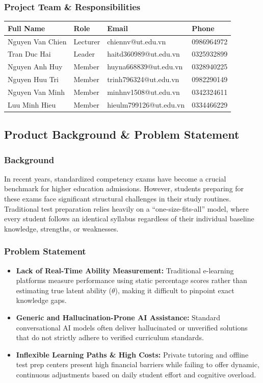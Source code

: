 \documentclass[12pt,a4paper]{article}
\begin{document}
\subsubsection{Project Team \& Responsibilities}
\begin{table}[H]
\centering
\small
\renewcommand{\arraystretch}{1.3}
\begin{tabularx}{\textwidth}{l l X l}
\toprule
\textbf{Full Name} & \textbf{Role} & \textbf{Email} & \textbf{Phone} \\
\midrule
Nguyen Van Chien & Lecturer & chiennv@ut.edu.vn & 0986964972 \\
Tran Duc Hai & Leader & haitd360989@ut.edu.vn & 0325932899 \\
Nguyen Anh Huy & Member & huyna668839@ut.edu.vn & 0328940225 \\
Nguyen Huu Tri & Member & trinh796324@ut.edu.vn & 0982290149 \\
Nguyen Van Minh & Member & minhnv1508@ut.edu.vn & 0342324611 \\
Luu Minh Hieu & Member & hieulm799126@ut.edu.vn & 0334466229 \\
\bottomrule
\end{tabularx}
\end{table}

\subsection{Product Background \& Problem Statement}
\subsubsection{Background}
In recent years, standardized competency exams have become a crucial benchmark for higher education admissions. However, students preparing for these exams face significant structural challenges in their study routines. Traditional test preparation relies heavily on a ``one-size-fits-all'' model, where every student follows an identical syllabus regardless of their individual baseline knowledge, strengths, or weaknesses.

\subsubsection{Problem Statement}
\begin{itemize}
    \item \textbf{Lack of Real-Time Ability Measurement:} Traditional e-learning platforms measure performance using static percentage scores rather than estimating true latent ability ($\theta$), making it difficult to pinpoint exact knowledge gaps.
    \item \textbf{Generic and Hallucination-Prone AI Assistance:} Standard conversational AI models often deliver hallucinated or unverified solutions that do not strictly adhere to verified curriculum standards.
    \item \textbf{Inflexible Learning Paths \& High Costs:} Private tutoring and offline test prep centers present high financial barriers while failing to offer dynamic, continuous adjustments based on daily student effort and cognitive overload.
\end{itemize}
\end{document}
